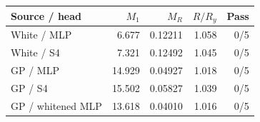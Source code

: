 \begin{tabular}{lrrrr}
\toprule
Source / head & $M_1$ & $M_R$ & $R/R_y$ & Pass \\
\midrule
White / MLP & 6.677 & 0.12211 & 1.058 & 0/5 \\
White / S4 & 7.321 & 0.12492 & 1.045 & 0/5 \\
GP / MLP & 14.929 & 0.04927 & 1.018 & 0/5 \\
GP / S4 & 15.502 & 0.05827 & 1.039 & 0/5 \\
GP / whitened MLP & 13.618 & 0.04010 & 1.016 & 0/5 \\
\bottomrule
\end{tabular}
